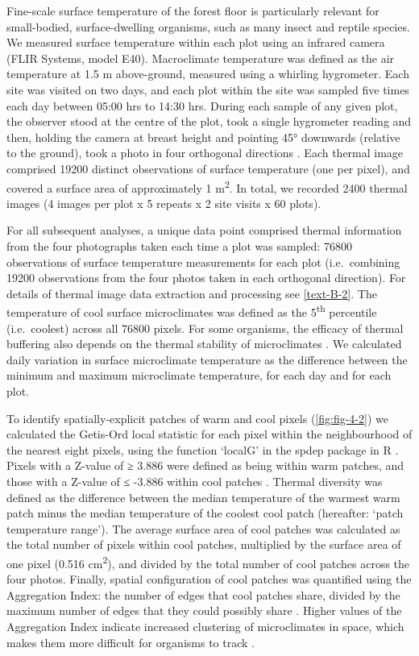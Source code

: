 \documentclass[12pt,a4paper,]{report}
\theoremstyle{definition}
\theoremstyle{definition}
\theoremstyle{definition}
\theoremstyle{remark}
\begin{document}
Fine-scale surface temperature of the forest floor is particularly
relevant for small-bodied, surface-dwelling organisms, such as many
insect and reptile species. We measured surface temperature within each
plot using an infrared camera (FLIR Systems, model E40). Macroclimate
temperature was defined as the air temperature at 1.5 m above-ground,
measured using a whirling hygrometer. Each site was visited on two days,
and each plot within the site was sampled five times each day between
05:00 hrs to 14:30 hrs. During each sample of any given plot, the
observer stood at the centre of the plot, took a single hygrometer
reading and then, holding the camera at breast height and pointing 45°
downwards (relative to the ground), took a photo in four orthogonal
directions \citep{scheffers_extreme_2017}. Each thermal image comprised
19200 distinct observations of surface temperature (one per pixel), and
covered a surface area of approximately 1 m\textsuperscript{2}. In
total, we recorded 2400 thermal images (4 images per plot x 5 repeats x
2 site visits x 60 plots).

For all subsequent analyses, a unique data point comprised thermal
information from the four photographs taken each time a plot was
sampled: 76800 observations of surface temperature measurements for each
plot (i.e.~combining 19200 observations from the four photos taken in
each orthogonal direction). For details of thermal image data extraction
and processing see \autoref{text-B-2}. The temperature of cool surface
microclimates was defined as the 5\textsuperscript{th} percentile
(i.e.~coolest) across all 76800 pixels. For some organisms, the efficacy
of thermal buffering also depends on the thermal stability of
microclimates \citep{shi_framework_2016}. We calculated daily variation
in surface microclimate temperature as the difference between the
minimum and maximum microclimate temperature, for each day and for each
plot.

To identify spatially-explicit patches of warm and cool pixels
(\autoref{fig:fig-4-2}) we calculated the Getis-Ord local statistic for
each pixel within the neighbourhood of the nearest eight pixels, using
the function `localG' in the spdep package in R
\citep{bivand_comparing_2015, r_core_team_2017}. Pixels with a Z-value
of ≥ 3.886 were defined as being within warm patches, and those with a
Z-value of ≤ -3.886 within cool patches \citep{getis_local_1996}.
Thermal diversity was defined as the difference between the median
temperature of the warmest warm patch minus the median temperature of
the coolest cool patch (hereafter: `patch temperature range'). The
average surface area of cool patches was calculated as the total number
of pixels within cool patches, multiplied by the surface area of one
pixel (0.516 cm\textsuperscript{2}), and divided by the total number of
cool patches across the four photos. Finally, spatial configuration of
cool patches was quantified using the Aggregation Index: the number of
edges that cool patches share, divided by the maximum number of edges
that they could possibly share
\citep{he_aggregation_2000, caillon_warming_2014}. Higher values of the
Aggregation Index indicate increased clustering of microclimates in
space, which makes them more difficult for organisms to track
\citep{sears_configuration_2016}.
\end{document}
